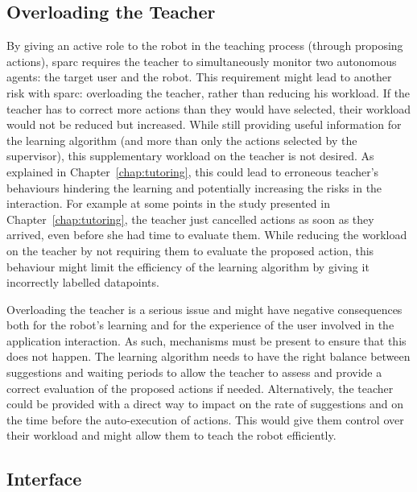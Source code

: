 \subsection{Overloading the Teacher}

By giving an active role to the robot in the teaching process (through proposing actions), \gls{sparc} requires  the teacher to simultaneously monitor two autonomous agents: the target user and the robot. This requirement might lead to another risk with \gls{sparc}: overloading the teacher, rather than reducing his workload. If the teacher has to correct more actions than they would have selected, their workload would not be reduced but increased. While still providing useful information for the learning algorithm (and more than only the actions selected by the supervisor), this supplementary workload on the teacher is not desired. As explained in Chapter~\ref{chap:tutoring}, this could lead to erroneous teacher's behaviours hindering the learning and potentially increasing the risks in the interaction. For example at some points in the study presented in Chapter~\ref{chap:tutoring}, the teacher just cancelled actions as soon as they arrived, even before she had time to evaluate them. While reducing the workload on the teacher by not requiring them to evaluate the proposed action, this behaviour might limit the efficiency of the learning algorithm by giving it incorrectly labelled datapoints. 

Overloading the teacher is a serious issue and might have negative consequences both for the robot's learning and for the experience of the user involved in the application interaction. As such, mechanisms must be present to ensure that this does not happen. The learning algorithm needs to have the right balance between suggestions and waiting periods to allow the teacher to assess and provide a correct evaluation of the proposed actions if needed. Alternatively, the teacher could be provided with a direct way to impact on the rate of suggestions and on the time before the auto-execution of actions. This would give them control over their workload and might allow them to teach the robot efficiently.%

\subsection{Interface}\label{sec:disc_lim_interface}

